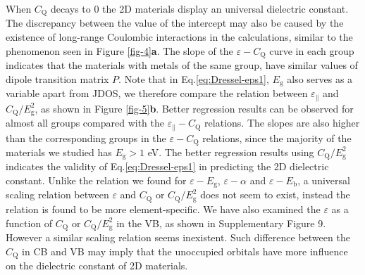 \documentclass[journal=ancac3,manuscript=article,email=true,hyperref=true,keywords=true]{achemso}
\begin{document}
%
When \(C_{\mathrm{Q}}\) decays to 0 the 2D materials display an universal dielectric
constant. The discrepancy between the value of the intercept may
also be caused by the existence of long-range Coulombic interactions
in the calculations, similar to the phenomenon seen in Figure
\ref{fig-4}{\bf a}. The slope of the \(\varepsilon-C_{\mathrm{Q}}\) curve in each
group indicates that the materials with metals of the same group, have
similar values of dipole transition matrix \(P\). 
Note that in Eq.\ref{eq:Dressel-eps1}, \(E_{\mathrm{g}}\) also serves as a variable apart from
JDOS, we therefore compare the relation between \(\varepsilon_{\parallel}\)
and \(C_{\mathrm{Q}}/E_{\mathrm{g}}^{2}\), as shown in Figure
\ref{fig-5}{\bf b}. Better regression results can be observed for almost all
groups compared with the \(\varepsilon_{\parallel}-C_{\mathrm{Q}}\)
relations. The slopes are also higher than the corresponding groups in
the \(\varepsilon-C_{\mathrm{Q}}\) relations, since the majority of the
materials we studied has \(E_{\mathrm{g}} > 1\) eV. The better
regression results using \(C_{\mathrm{Q}}/E_{\mathrm{g}}^{2}\) indicates
the validity of Eq.\ref{eq:Dressel-eps1} in predicting the 2D dielectric constant. 
Unlike the relation we found for
\(\varepsilon-E_{\mathrm{g}}\), \(\varepsilon-\alpha\) and
\(\varepsilon-E_{\mathrm{b}}\), a universal scaling relation between
\(\varepsilon\) and \(C_{\mathrm{Q}}\) or \(C_{\mathrm{Q}}/E_{\mathrm{g}}^{2}\)
does not seem to exist, instead the relation is found to be more
element-specific. We have also examined the \(\varepsilon\) as a function
of \(C_{\mathrm{Q}}\) or \(C_{\mathrm{Q}}/E_{\mathrm{g}}^{2}\) in the VB,
as shown in Supplementary Figure 9. However a similar scaling relation seems 
inexistent. Such difference between the \(C_{\mathrm{Q}}\) in CB and VB
may imply that the unoccupied orbitals have more influence on the
dielectric constant of 2D materials. 
\end{document}
